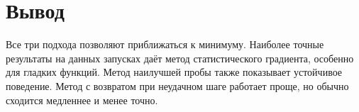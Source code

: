 \documentclass[12pt,a4paper]{article}
\begin{document}
\section*{Вывод}

Все три подхода позволяют приближаться к минимуму. Наиболее точные результаты на данных запусках даёт метод статистического градиента, особенно для гладких функций. Метод наилучшей пробы также показывает устойчивое поведение. Метод с возвратом при неудачном шаге работает проще, но обычно сходится медленнее и менее точно.
\end{document}

